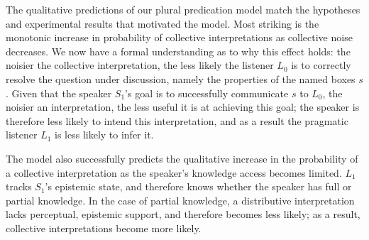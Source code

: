 \documentclass[linguex]{sp}
\begin{document}



The qualitative predictions of our plural predication model match the hypotheses and experimental results that motivated the model. Most striking is the monotonic increase in probability of collective interpretations as collective noise decreases. %
We now have a formal understanding as to why this effect holds: the noisier the collective interpretation, the less likely the listener $L_{0}$ is to correctly resolve the question under discussion, namely the properties of the named boxes $s$. Given that the speaker $S_{1}$'s goal is to successfully communicate $s$ to $L_{0}$, the noisier an interpretation, the less useful it is at achieving this goal; the speaker is therefore less likely to intend this interpretation, and as a result the pragmatic listener $L_{1}$ is less likely to infer it.

The model also successfully predicts the qualitative increase in the probability of a collective interpretation as the speaker's knowledge access becomes limited. %
$L_{1}$ tracks  $S_{1}$'s epistemic state, and therefore knows whether the speaker has full or partial knowledge. In the case of partial knowledge, a distributive interpretation lacks perceptual, epistemic support, and therefore becomes less likely; as a result, collective interpretations become more likely.

\end{document}
